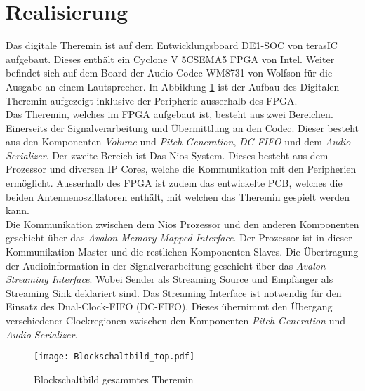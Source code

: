 \clearpage
\section{Realisierung}\label{sec:Realisierung}

Das digitale Theremin ist auf dem Entwicklungsboard DE1-SOC von terasIC aufgebaut. Dieses enthält ein Cyclone V 5CSEMA5 FPGA von Intel. Weiter befindet sich auf dem Board der Audio Codec WM8731 von Wolfson für die Ausgabe an einem Lautsprecher. In Abbildung \ref{img:Blockschaltbild_top} ist der Aufbau des Digitalen Theremin aufgezeigt inklusive der Peripherie ausserhalb des FPGA.\\
Das Theremin, welches im FPGA aufgebaut ist, besteht aus zwei Bereichen. Einerseits der Signalverarbeitung und Übermittlung an den Codec. Dieser besteht aus den Komponenten \textit{Volume} und \textit{Pitch Generation}, \textit{DC-FIFO} und dem \textit{Audio Serializer}. Der zweite Bereich ist Das Nios System. Dieses besteht aus dem Prozessor und diversen IP Cores, welche die Kommunikation mit den Peripherien ermöglicht. Ausserhalb des FPGA ist zudem das entwickelte PCB, welches die beiden Antennenoszillatoren enthält, mit welchen das Theremin gespielt werden kann.\\
Die Kommunikation zwischen dem Nios Prozessor und den anderen Komponenten geschieht über das \textit{Avalon Memory Mapped Interface}. Der Prozessor ist in dieser Kommunikation Master und die restlichen Komponenten Slaves. Die Übertragung der Audioinformation in der Signalverarbeitung geschieht über das \textit{Avalon Streaming Interface}. Wobei Sender als Streaming Source und Empfänger als Streaming Sink deklariert sind. Das Streaming Interface ist notwendig für den Einsatz des Dual-Clock-FIFO (DC-FIFO). Dieses übernimmt den Übergang verschiedener Clockregionen zwischen den Komponenten \textit{Pitch Generation} und \textit{Audio Serializer}.

\begin{figure}[h!]
	\centering
	\texttt{[image: Blockschaltbild\_top.pdf]}
	\caption{Blockschaltbild gesammtes Theremin} 
	\label{img:Blockschaltbild_top}
\end{figure}  


